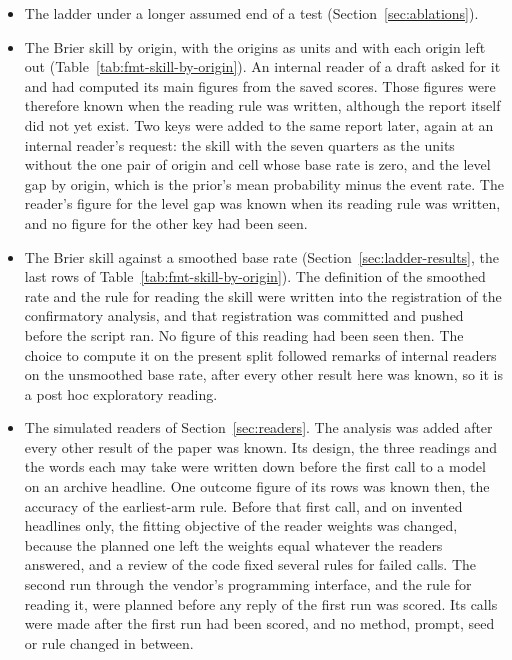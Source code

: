 \begin{itemize}
\item The ladder under a longer assumed end of a test (Section~\ref{sec:ablations}).
\item The Brier skill by origin, with the origins as units and with each origin left out (Table~\ref{tab:fmt-skill-by-origin}). An internal reader of a draft asked for it and had computed its main figures from the saved scores. Those figures were therefore known when the reading rule was written, although the report itself did not yet exist. Two keys were added to the same report later, again at an internal reader's request: the skill with the seven quarters as the units without the one pair of origin and cell whose base rate is zero, and the level gap by origin, which is the prior's mean probability minus the event rate. The reader's figure for the level gap was known when its reading rule was written, and no figure for the other key had been seen.
\item The Brier skill against a smoothed base rate (Section~\ref{sec:ladder-results}, the last rows of Table~\ref{tab:fmt-skill-by-origin}). The definition of the smoothed rate and the rule for reading the skill were written into the registration of the confirmatory analysis, and that registration was committed and pushed before the script ran. No figure of this reading had been seen then. The choice to compute it on the present split followed remarks of internal readers on the unsmoothed base rate, after every other result here was known, so it is a post hoc exploratory reading.
\item The simulated readers of Section~\ref{sec:readers}. The analysis was added after every other result of the paper was known. Its design, the three readings and the words each may take were written down before the first call to a model on an archive headline. One outcome figure of its rows was known then, the accuracy of the earliest-arm rule. Before that first call, and on invented headlines only, the fitting objective of the reader weights was changed, because the planned one left the weights equal whatever the readers answered, and a review of the code fixed several rules for failed calls. The second run through the vendor's programming interface, and the rule for reading it, were planned before any reply of the first run was scored. Its calls were made after the first run had been scored, and no method, prompt, seed or rule changed in between.
\end{itemize}

